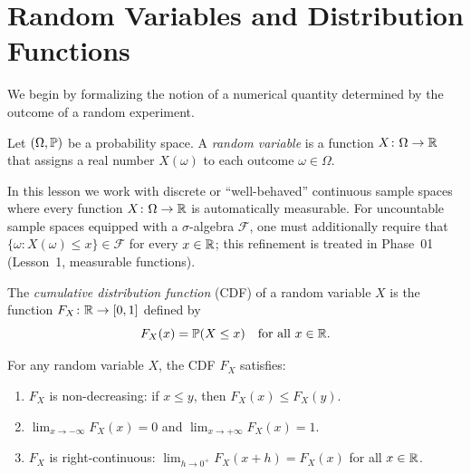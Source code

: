 \documentclass[11pt,a4paper]{article}
\begin{document}

\section{Random Variables and Distribution Functions}
\label{sec:rv_cdf}

We begin by formalizing the notion of a numerical quantity determined by
the outcome of a random experiment.

\begin{definition}
\label{def:random_variable}
Let $(\Omega, \mathbb{P})$ be a probability space. A \emph{random variable} is
a function $X \colon \Omega \to \mathbb{R}$ that assigns a real number $X(\omega)$
to each outcome $\omega \in \Omega$.
\end{definition}

\begin{remark}
\label{rem:measurability}
In this lesson we work with discrete or ``well-behaved'' continuous sample
spaces where every function $X \colon \Omega \to \mathbb{R}$ is automatically
measurable. For uncountable sample spaces equipped with a
$\sigma$-algebra $\mathcal{F}$, one must additionally require that
$\{\omega : X(\omega) \leq x\} \in \mathcal{F}$ for every $x \in \mathbb{R}$;
this refinement is treated in Phase~01 (Lesson~1, measurable functions).
\end{remark}

\begin{definition}
\label{def:cdf}
The \emph{cumulative distribution function} (CDF) of a random variable
$X$ is the function $F_X \colon \mathbb{R} \to [0,1]$ defined by
\[
    F_X(x) = \mathbb{P}(X \leq x) \quad \text{for all } x \in \mathbb{R}.
\]
\end{definition}

\begin{proposition}
\label{prop:cdf_properties}
For any random variable $X$, the CDF $F_X$ satisfies:
\begin{enumerate}[nosep,label=(\roman*)]
    \item $F_X$ is non-decreasing: if $x \leq y$, then
    $F_X(x) \leq F_X(y)$.
    \item $\lim_{x \to -\infty} F_X(x) = 0$ and
    $\lim_{x \to +\infty} F_X(x) = 1$.
    \item $F_X$ is right-continuous: $\lim_{h \to 0^+} F_X(x+h) = F_X(x)$
    for all $x \in \mathbb{R}$.
\end{enumerate}
\end{proposition}
\end{document}
